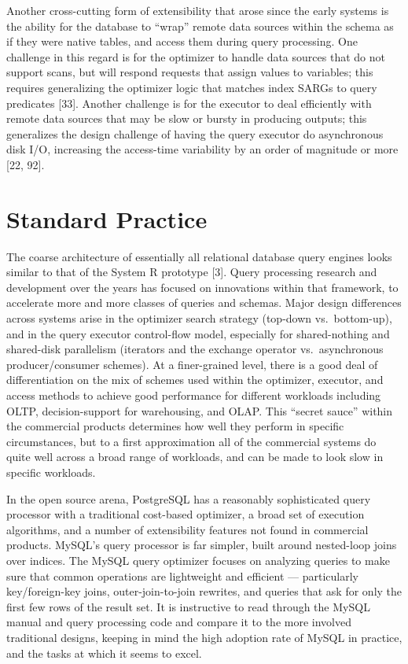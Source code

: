 \documentclass[b5paper,11pt,twoside,openright]{book}
\begin{document}
Another cross-cutting form of extensibility that arose since the early
systems is the ability for the database to ``wrap'' remote data sources
within the schema as if they were native tables, and access them during
query processing. One challenge in this regard is for the optimizer to
handle data sources that do not support scans, but will respond requests
that assign values to variables; this requires generalizing the
optimizer logic that matches index SARGs to query predicates {[}33{]}.
Another challenge is for the executor to deal efficiently with remote
data sources that may be slow or bursty in producing outputs; this
generalizes the design challenge of having the query executor do
asynchronous disk I/O, increasing the access-time variability by an
order of magnitude or more {[}22, 92{]}.

\hypertarget{standard-practice-2}{%
\section{Standard Practice}\label{standard-practice-2}}

The coarse architecture of essentially all relational database query
engines looks similar to that of the System R prototype {[}3{]}. Query
processing research and development over the years has focused on
innovations within that framework, to accelerate more and more classes
of queries and schemas. Major design differences across systems arise in
the optimizer search strategy (top-down vs.~bottom-up), and in the query
executor control-flow model, especially for shared-nothing and
shared-disk parallelism (iterators and the exchange operator
vs.~asynchronous producer/consumer schemes). At a finer-grained level,
there is a good deal of differentiation on the mix of schemes used
within the optimizer, executor, and access methods to achieve good
performance for different workloads including OLTP, decision-support for
warehousing, and OLAP. This ``secret sauce'' within the commercial
products determines how well they perform in specific circumstances, but
to a first approximation all of the commercial systems do quite well
across a broad range of workloads, and can be made to look slow in
specific workloads.

In the open source arena, PostgreSQL has a reasonably sophisticated
query processor with a traditional cost-based optimizer, a broad set of
execution algorithms, and a number of extensibility features not found
in commercial products. MySQL's query processor is far simpler, built
around nested-loop joins over indices. The MySQL query optimizer focuses
on analyzing queries to make sure that common operations are lightweight
and efficient --- particularly key/foreign-key joins, outer-join-to-join
rewrites, and queries that ask for only the first few rows of the result
set. It is instructive to read through the MySQL manual and query
processing code and compare it to the more involved traditional designs,
keeping in mind the high adoption rate of MySQL in practice, and the
tasks at which it seems to excel.
\end{document}

